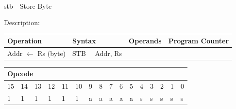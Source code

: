\documentclass[%
	pdftex,
	a4paper,
	oneside,
	bibtotoc,%
	idxtotoc,%
	bibtotocnumbered,
	halfparskip,%
]{scrbook}
\begin{document}
\bigskip

stb - Store Byte

Description:

\begin{tabular}{|l|l|l|l|}
\hline
Operation & Syntax & Operands & Program Counter \\ \hline
Addr $\leftarrow $ Rs (byte) & STB \ \ Addr, Rs &  &  \\ \hline
\end{tabular}

\begin{tabular}{|c|c|c|c|c|c|c|c|c|c|c|c|c|c|c|c|}
\hline
\multicolumn{6}{|l|}{Opcode} & \multicolumn{5}{|l|}{} & \multicolumn{5}{|l|}{
} \\ \hline
15 & 14 & 13 & 12 & 11 & 10 & 9 & 8 & 7 & 6 & 5 & 4 & 3 & 2 & 1 & 0 \\ \hline
\multicolumn{1}{|l|}{1} & \multicolumn{1}{|l|}{1} & \multicolumn{1}{|l|}{1}
& \multicolumn{1}{|l|}{1} & \multicolumn{1}{|l|}{1} & \multicolumn{1}{|l|}{1}
& \multicolumn{1}{|l|}{a} & \multicolumn{1}{|l|}{a} & \multicolumn{1}{|l|}{a}
& \multicolumn{1}{|l|}{a} & \multicolumn{1}{|l|}{a} & \multicolumn{1}{|l|}{s}
& \multicolumn{1}{|l|}{s} & \multicolumn{1}{|l|}{s} & \multicolumn{1}{|l|}{s}
& \multicolumn{1}{|l|}{s} \\ \hline
\end{tabular}

\bigskip
\end{document}
